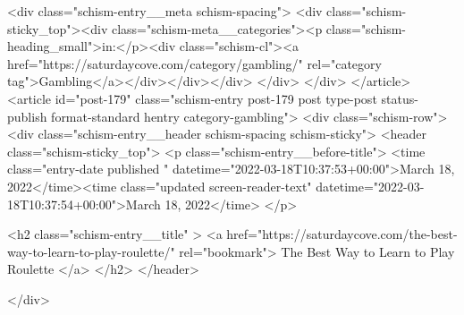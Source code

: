 {		<div class="schism-entry__meta schism-spacing">			<div class="schism-sticky_top"><div class="schism-meta__categories"><p class="schism-heading_small">in:</p><div class="schism-cl"><a href="https://saturdaycove.com/category/gambling/" rel="category tag">Gambling</a></div></div></div>		</div>
	</div>
</article>
<article id="post-179" class="schism-entry post-179 post type-post status-publish format-standard hentry category-gambling">
	<div class="schism-row">		<div class="schism-entry__header schism-spacing schism-sticky">			<header class="schism-sticky_top">				<p class="schism-entry__before-title">
					<time class="entry-date published " datetime="2022-03-18T10:37:53+00:00">March 18, 2022</time><time class="updated screen-reader-text" datetime="2022-03-18T10:37:54+00:00">March 18, 2022</time>				</p>

				<h2 class="schism-entry__title" >
					<a href="https://saturdaycove.com/the-best-way-to-learn-to-play-roulette/" rel="bookmark">
						The Best Way to Learn to Play Roulette					</a>
				</h2>
			</header>

					</div>

}
